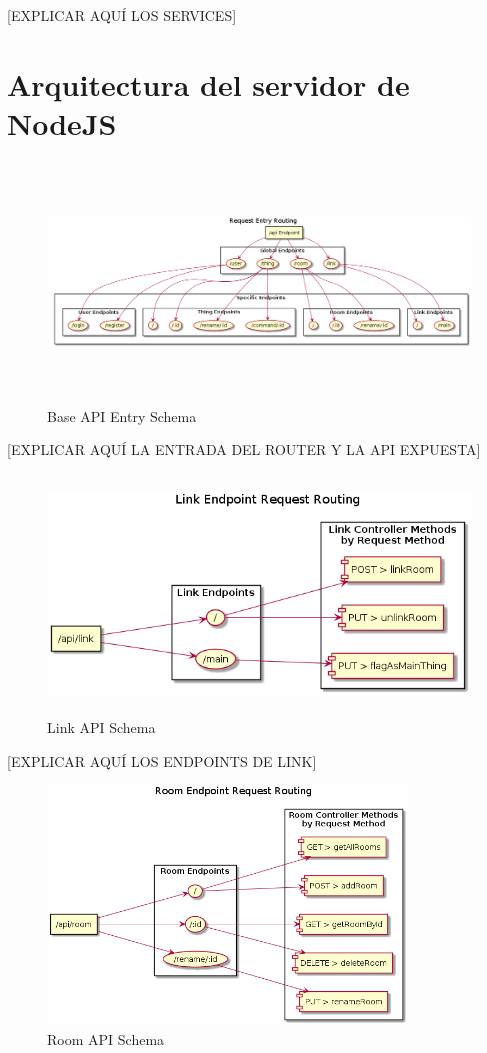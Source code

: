 [EXPLICAR AQUÍ LOS SERVICES]

\section{Arquitectura del servidor de NodeJS}
\label{makereference4.6}


\begin{figure}[hbt!]
\centering
\includegraphics[height=2.5in]{figures/diagrams/back/router-flow/api-entry.png}
\caption[api-entry]{Base API Entry Schema\footnotemark}
\end{figure}

[EXPLICAR AQUÍ LA ENTRADA DEL ROUTER Y LA API EXPUESTA]

\begin{figure}[hbt!]
\centering
\includegraphics[height=2.5in]{figures/diagrams/back/router-flow/link-endpoints.png}
\caption[link-endpoints]{Link API Schema\footnotemark}
\end{figure}

[EXPLICAR AQUÍ LOS ENDPOINTS DE LINK]

\begin{figure}[hbt!]
\centering
\includegraphics[height=2.5in]{figures/diagrams/back/router-flow/room-endpoints.png}
\caption[room-endpoints]{Room API Schema\footnotemark}
\end{figure}

